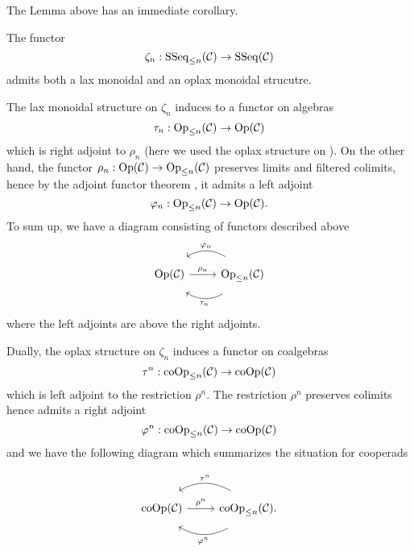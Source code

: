 The Lemma above has an immediate corollary.
\begin{corollary}
\label{functors between operads adn their truncations}
    The functor 
    $$
    \zeta_n: \operatorname{SSeq}_{\leq n}({\mathcal{C}}) \to \operatorname{SSeq}({\mathcal{C}})
    $$
    admits both a lax monoidal and an oplax monoidal strucutre. 
\end{corollary}
    The lax monoidal structure on $\zeta_n$ induces to a functor on algebras
    $$
    \tau_{n}:\operatorname{Op}_{\leq n}({\mathcal{C}})
    \to 
    \operatorname{Op}({\mathcal{C}})
    $$
    which is right adjoint to $\rho_{n}$ (here we used the oplax structure on ). On the other hand, the functor $\rho_n:\operatorname{Op}({\mathcal{C}}) \to \operatorname{Op}_{\leq n}({\mathcal{C}})$ preserves limits and filtered colimits, hence by the adjoint functor theorem \cite[Corollary 5.5.2.9.]{HTT}, it admits a left adjoint 
    $$
    \varphi_n: \operatorname{Op}_{\leq n}({\mathcal{C}})
    \to 
    \operatorname{Op}({\mathcal{C}}).
    $$
    To sum up, we have a diagram consisting of functors described above
\begin{equation}
\label{Op-Op_n adjunction}
	\begin{tikzcd}
 \Opd(\CC) & \operatorname{Op}_{\leq n}(\CC) 
	\arrow[from=1-2, to= 1-1, bend right, shift right = 3, "\varphi_n" above]
	\arrow[from=1-2, to=1-1, bend left, shift left = 3, "\tau_n" below]
	\arrow[from=1-1, to=1-2, "\rho_n"]
\end{tikzcd}
\end{equation}
where the left adjoints are above the right adjoints.
    

    
    Dually, the oplax structure on $\zeta_n$ induces a functor on coalgebras
    $$
    \tau^{n}:\operatorname{coOp}_{\leq n}({\mathcal{C}})
    \to 
    \operatorname{coOp}({\mathcal{C}})
    $$
    which is left adjoint to the restriction $\rho^n$. The restriction $\rho^n$ preserves colimits hence admits a right adjoint
    $$
    \varphi^{n}: \operatorname{coOp}_{\leq n}({\mathcal{C}})
    \to 
    \operatorname{coOp}({\mathcal{C}})
    $$
    and we have the following diagram which summarizes the situation for cooperads
    
    \begin{equation}
\label{coOp-coOp_n adjunction}
	\begin{tikzcd}
\Coop(\CC) & \operatorname{coOp}_{\leq n}(\CC)
	\arrow[from=1-2, to= 1-1, bend right, shift right = 3, "\tau^n" above]
	\arrow[from=1-2, to=1-1, bend left, shift left = 3, "\varphi^n" below]
	\arrow[from=1-1, to=1-2, "\rho^n"].
\end{tikzcd}
\end{equation}


